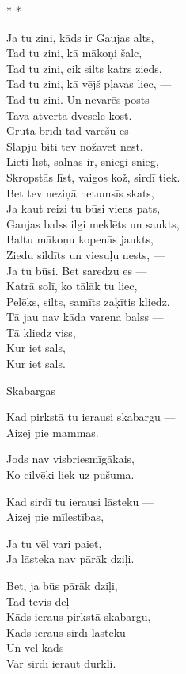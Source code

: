 \documentclass[14pt]{extarticle}
\begin{document}
\newpage

{\large \sc * * *}

Ja tu zini, kāds ir Gaujas alts,\\
Tad tu zini, kā mākoņi šalc,\\
Tad tu zini, cik silts katrs zieds,\\
Tad tu zini, kā vējš pļavas liec, ---\\
Tad tu zini. Un nevarēs posts\\
Tavā atvērtā dvēselē kost.\\
Grūtā brīdī tad varēšu es\\
Slapju biti tev nožāvēt nest.\\
Lieti līst, salnas ir, sniegi snieg,\\
Skropstās līst, vaigos kož, sirdī tiek.\\
Bet tev neziņā netumsīs skats,\\
Ja kaut reizi tu būsi viens pats,\\
Gaujas balss ilgi meklēts un saukts,\\
Baltu mākoņu kopenās jaukts,\\
Ziedu sildīts un viesuļu nests, ---\\
Ja tu būsi. Bet saredzu es ---\\
Katrā solī, ko tālāk tu liec,\\
Pelēks, silts, samīts zaķītis kliedz.\\
Tā jau nav kāda varena balss ---\\
Tā kliedz viss,\\
Kur iet sals,\\
Kur iet sals.


\newpage

{\large \sc Skabargas}

Kad pirkstā tu ierausi skabargu ---\\
Aizej pie mammas.

Jods nav visbriesmīgākais,\\
Ko cilvēki liek uz pušuma.

Kad sirdī tu ierausi lāsteku ---\\
Aizej pie mīlestības,

Ja tu vēl vari paiet,\\
Ja lāsteka nav pārāk dziļi.

Bet, ja būs pārāk dziļi,\\
Tad tevis dēļ\\
Kāds ieraus pirkstā skabargu,\\
Kāds ieraus sirdī lāsteku\\
Un vēl kāds\\
Var sirdī ieraut durkli.
\end{document}
